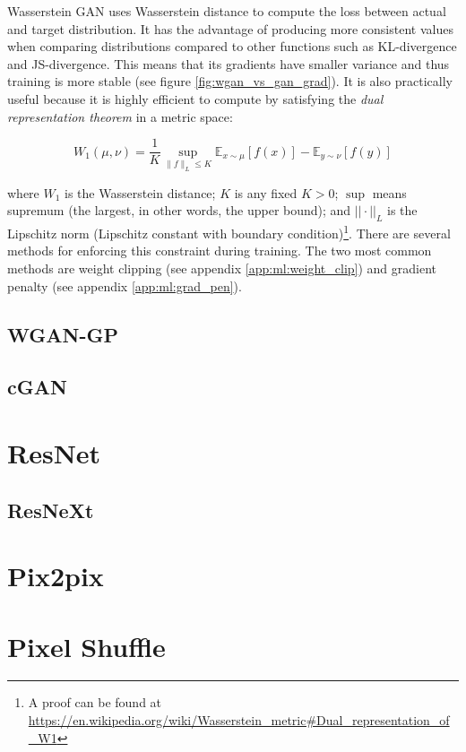 Wasserstein GAN uses Wasserstein distance to compute the loss between actual and target distribution. It has the advantage of producing more consistent values when comparing distributions compared to other functions such as KL-divergence and JS-divergence. This means that its gradients have smaller variance and thus training is more stable (see figure \ref{fig:wgan_vs_gan_grad}). It is also practically useful because it is highly efficient to compute by satisfying the \textit{dual representation theorem} in a metric space:

$$
W_{1}(\mu, \nu)=\frac{1}{K} \sup _{\|f\|_{L} \leq K} \mathbb{E}_{x \sim \mu}[f(x)]-\mathbb{E}_{y \sim \nu}[f(y)]
$$

where $W_1$ is the Wasserstein distance; $K$ is any fixed $K > 0$; $\sup$ means supremum (the largest, in other words, the upper bound); and $||\cdot||_L$ is the Lipschitz norm (Lipschitz constant with boundary condition)\footnote{A proof can be found at \url{https://en.wikipedia.org/wiki/Wasserstein\_metric\#Dual\_representation\_of\_W1}}. There are several methods for enforcing this constraint during training. The two most common methods are weight clipping (see appendix \ref{app:ml:weight_clip}) and gradient penalty (see appendix \ref{app:ml:grad_pen}).






\subsection{WGAN-GP}

\subsection{cGAN}

\section{ResNet}

\subsection{ResNeXt}

\section{Pix2pix}

\section{Pixel Shuffle}
